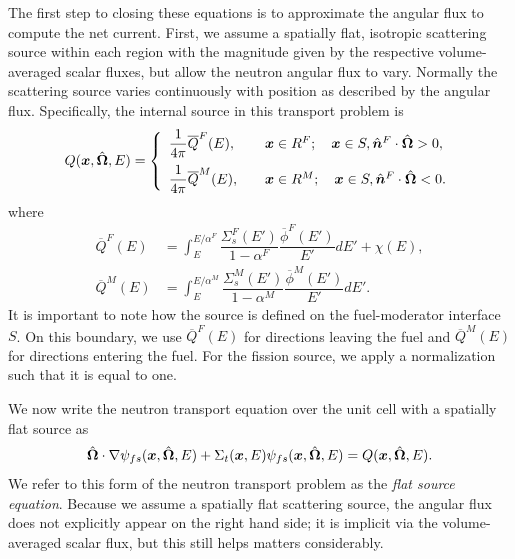The first step to closing these equations is to approximate the angular flux to compute the net current. First, we assume a spatially flat, isotropic scattering source within each region with the magnitude given by the respective volume-averaged scalar fluxes, but allow the neutron angular flux to vary. Normally the scattering source varies continuously with position as described by the angular flux. Specifically, the internal source in this transport problem is
\begin{align}
  Q(\pos,\dir,E) = \left\{ \begin{array}{l l}
  \dfrac{1}{4\pi} \overline{Q}^F(E), & \quad \pos \in R^F; \quad \pos \in S, \nhat^F \cdot \dir > 0, \vspace{0.2cm} \\ 
  \dfrac{1}{4\pi} \overline{Q}^M(E), & \quad \pos \in R^M; \quad \pos \in S, \nhat^F \cdot \dir < 0. \\ \end{array} \right.
\end{align}
where
\begin{subequations} \label{Eq:thermalization_flatScatteringSources_Qbar}
\begin{align}
  \overline{Q}^F(E) &= \displaystyle\int_E^{E/\alpha^F} \dfrac{ \Sigma_s^F(E') }{ 1 - \alpha^F } \dfrac{ \overline{\phi}^F(E') }{ E' } dE' + \chi(E), \\
  \overline{Q}^M(E) &= \displaystyle\int_E^{E/\alpha^M} \dfrac{ \Sigma_s^M(E') }{ 1 - \alpha^M } \dfrac{ \overline{\phi}^M(E') }{ E' } dE'.
\end{align}
\end{subequations}
It is important to note how the source is defined on the fuel-moderator interface $S$. On this boundary, we use $\overline{Q}^F(E)$ for directions leaving the fuel and $\overline{Q}^M(E)$ for directions entering the fuel. For the fission source, we apply a normalization such that it is equal to one.

We now write the neutron transport equation over the unit cell with a spatially flat source as
\begin{align}
  \hat{\mathbf{\Omega}} \cdot \nabla \psi_{fs}(\bm{x},\hat{\mathbf{\Omega}},E) + \Sigma_t(\bm{x},E) \psi_{fs}(\bm{x},\hat{\mathbf{\Omega}},E) = Q(\bm{x},\hat{\mathbf{\Omega}},E). \label{Eq:thermalization_flatSourceEquation_initialForm}
\end{align}
We refer to this form of the neutron transport problem as the \emph{flat source equation}. Because we assume a spatially flat scattering source, the angular flux does not explicitly appear on the right hand side; it is implicit via the volume-averaged scalar flux, but this still helps matters considerably.

